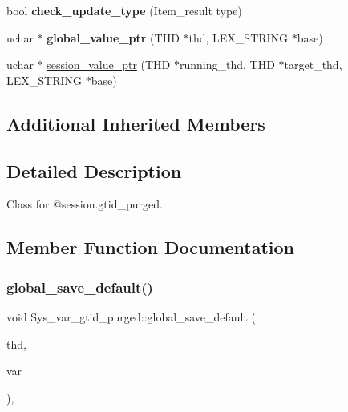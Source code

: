 \begin{DoxyCompactItemize}
\item 
\mbox{\label{classSys__var__gtid__purged_ad3db49960cc75f00493f6d62cd4e243c}} 
bool {\bfseries check\+\_\+update\+\_\+type} (Item\+\_\+result type)
\item 
\mbox{\label{classSys__var__gtid__purged_a2d737061c1c21bfb1612883823ca54db}} 
uchar $\ast$ {\bfseries global\+\_\+value\+\_\+ptr} (T\+HD $\ast$thd, L\+E\+X\+\_\+\+S\+T\+R\+I\+NG $\ast$base)
\item 
uchar $\ast$ \mbox{\hyperlink{classSys__var__gtid__purged_adc6d9e58936e3f27ea45e549510be42f}{session\+\_\+value\+\_\+ptr}} (T\+HD $\ast$running\+\_\+thd, T\+HD $\ast$target\+\_\+thd, L\+E\+X\+\_\+\+S\+T\+R\+I\+NG $\ast$base)
\end{DoxyCompactItemize}
\subsection*{Additional Inherited Members}


\subsection{Detailed Description}
Class for @session.\+gtid\+\_\+purged. 

\subsection{Member Function Documentation}
\mbox{\label{classSys__var__gtid__purged_a7520649b0e520db8ab51b1e1e0c94b9e}} 
\subsubsection{\texorpdfstring{global\+\_\+save\+\_\+default()}{global\_save\_default()}}
{\footnotesize\ttfamily void Sys\+\_\+var\+\_\+gtid\+\_\+purged\+::global\+\_\+save\+\_\+default (\begin{DoxyParamCaption}\item[{T\+HD $\ast$}]{thd,  }\item[{\mbox{\hyperlink{classset__var}{set\+\_\+var}} $\ast$}]{var }\end{DoxyParamCaption})\hspace{0.3cm}{\ttfamily [inline]}, {\ttfamily [virtual]}}

